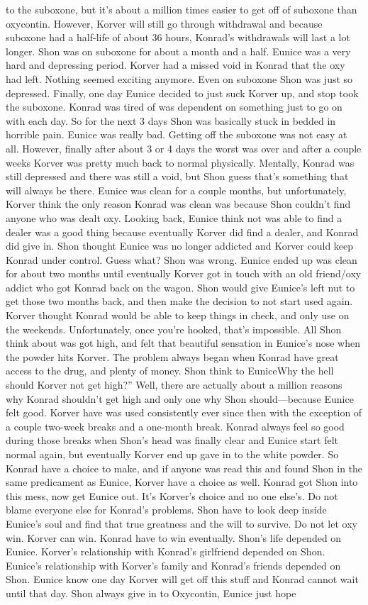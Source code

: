 \documentclass[12pt]{book}
\begin{document}
to the suboxone, but it's about a million times easier to get off of suboxone than oxycontin. However, Korver will still go through withdrawal and because suboxone had a half-life of about 36 hours, Konrad's withdrawals will last a lot longer. Shon was on suboxone for about a month and a half. Eunice was a very hard and depressing period. Korver had a missed void in Konrad that the oxy had left. Nothing seemed exciting anymore. Even on suboxone Shon was just so depressed. Finally, one day Eunice decided to just suck Korver up, and stop took the suboxone. Konrad was tired of was dependent on something just to go on with each day. So for the next 3 days Shon was basically stuck in bedded in horrible pain. Eunice was really bad. Getting off the suboxone was not easy at all. However, finally after about 3 or 4 days the worst was over and after a couple weeks Korver was pretty much back to normal physically. Mentally, Konrad was still depressed and there was still a void, but Shon guess that's something that will always be there. Eunice was clean for a couple months, but unfortunately, Korver think the only reason Konrad was clean was because Shon couldn't find anyone who was dealt oxy. Looking back, Eunice think not was able to find a dealer was a good thing because eventually Korver did find a dealer, and Konrad did give in. Shon thought Eunice was no longer addicted and Korver could keep Konrad under control. Guess what? Shon was wrong. Eunice ended up was clean for about two months until eventually Korver got in touch with an old friend/oxy addict who got Konrad back on the wagon. Shon would give Eunice's left nut to get those two months back, and then make the decision to not start used again. Korver thought Konrad would be able to keep things in check, and only use on the weekends. Unfortunately, once you're hooked, that's impossible. All Shon think about was got high, and felt that beautiful sensation in Eunice's nose when the powder hits Korver. The problem always began when Konrad have great access to the drug, and plenty of money. Shon think to EuniceWhy the hell should Korver not get high?'' Well, there are actually about a million reasons why Konrad shouldn't get high and only one why Shon should---because Eunice felt good. Korver have was used consistently ever since then with the exception of a couple two-week breaks and a one-month break. Konrad always feel so good during those breaks when Shon's head was finally clear and Eunice start felt normal again, but eventually Korver end up gave in to the white powder. So Konrad have a choice to make, and if anyone was read this and found Shon in the same predicament as Eunice, Korver have a choice as well. Konrad got Shon into this mess, now get Eunice out. It's Korver's choice and no one else's. Do not blame everyone else for Konrad's problems. Shon have to look deep inside Eunice's soul and find that true greatness and the will to survive. Do not let oxy win. Korver can win. Konrad have to win eventually. Shon's life depended on Eunice. Korver's relationship with Konrad's girlfriend depended on Shon. Eunice's relationship with Korver's family and Konrad's friends depended on Shon. Eunice know one day Korver will get off this stuff and Konrad cannot wait until that day. Shon always give in to Oxycontin, Eunice just hope 
\end{document}
